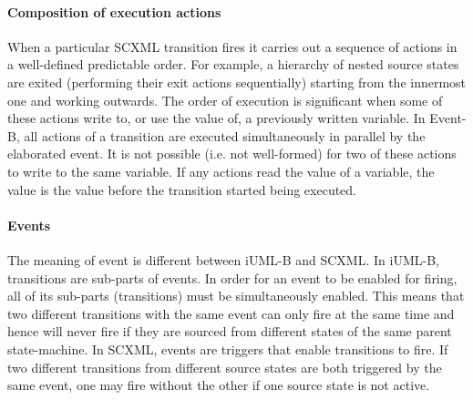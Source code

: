 \paragraph{Composition of execution actions}
When a particular SCXML transition fires it carries out a sequence of actions in a well-defined predictable order. 
For example, a hierarchy of nested source states are exited (performing their exit actions sequentially) starting from the innermost one and working outwards.
The order of execution is significant when some of these actions write to, or use the value of, a previously written variable. 
In Event-B, all actions of a transition are executed simultaneously in parallel by the elaborated event. 
It  is not possible (i.e. not well-formed) for two of these actions to write to the same variable.
If any actions read the value of a variable, the value is the value before the transition started being executed.
\vspace{-0.25cm}


\paragraph{Events}
The meaning of event is different between iUML-B and SCXML.
 In iUML-B, transitions are sub-parts of events. 
 In order for an event to be enabled for firing, all of its sub-parts (transitions) must be simultaneously enabled. 
 This means that two different transitions with the same event can only fire at the same time and hence will never fire if they are sourced from different states of the same parent state-machine. 
In SCXML, events are triggers that enable transitions to fire. 
If two different transitions from different source states are both triggered by the same event, one may fire without the other if one source state is not active.
\vspace{-0.25cm}

